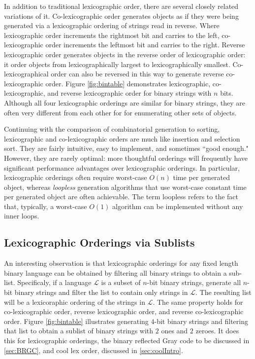 
In addition to traditional lexicographic order, there are several closely related variations of it. Co-lexicographic order generates objects as if they were being generated via a lexicographic ordering of strings read in reverse.  Where lexicographic order increments the rightmost bit and carries to the left, co-lexicographic order increments the leftmost bit and carries to the right. Reverse lexicographic order generates objects in the reverse order of lexicographic order: it order objects from lexicographically largest to lexicographically smallest. Co-lexicographical order can also be reversed in this way to generate reverse co-lexicographic order. Figure \ref{fig:bintable} demonstrates lexicographic, co-lexicographic, and reverse lexicographic order for binary strings with $n$ bits.  Although all four lexicographic orderings are similar for binary strings, they are often very different from each other for for enumerating other sets of objects.

Continuing with the comparison of combinatorial generation to sorting, lexicographic and co-lexicographic orders are much like insertion and selection sort.  They are fairly intuitive, easy to implement, and sometimes ``good enough."  However, they are rarely optimal: more thoughtful orderings will frequently have significant performance advantages over lexicographic orderings. In particular, lexicographic orderings often require worst-case $O(n)$ time per generated object, whereas \emph{loopless} generation algorithms that use worst-case constant time per generated object are often achievable. The term loopless refers to the fact that, typically, a worst-case $O(1)$ algorithm can be implemented without any inner loops.

 \subsection{Lexicographic Orderings via Sublists}
 An interesting observation is that lexicographic orderings for any fixed length binary language can be obtained by filtering all binary strings to obtain a sub-list. Specificaly, if a language $\mathcal{L}$ is a subset of $n$-bit binary strings, generate all $n$-bit binary strings and filter the list to contain only strings in $\mathcal{L}$.  The resulting list will be a lexicoraphic ordering of the strings in $\mathcal{L}$.  The same property holds for co-lexicographic order, reverse lexicographic order, and reverse co-lexicographic order.  Figure \ref{fig:bintable} illustrates generating $4$-bit binary strings and filtering that list to obtain a sublist of binary strings with $2$ ones and $2$ zeroes.  It does this for lexicographic orderings, the binary reflected Gray code to be discussed in \ref{sec:BRGC}, and cool lex order, discussed in \ref{sec:coolIntro}.


